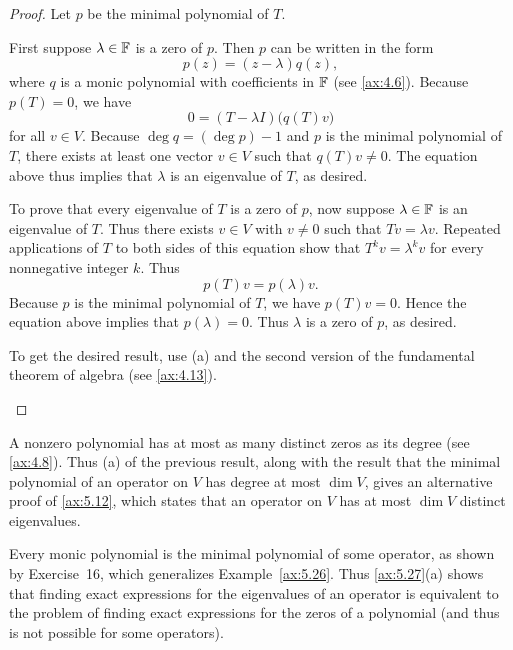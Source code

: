 \begin{proof}
Let $p$ be the minimal polynomial of $T$.
\begin{parts}
\item First suppose $\lambda\in\mathbb{F}$ is a zero of $p$. Then $p$ can be written
  in the form
  \[ p(z)=(z-\lambda)q(z), \]
  where $q$ is a monic polynomial with coefficients in $\mathbb{F}$ (see
  \ref{ax:4.6}). Because $p(T)=0$, we have
  \[ 0=(T-\lambda I)\bigl(q(T)v\bigr) \]
  for all $v\in V$. Because $\deg q=(\deg p)-1$ and $p$ is the minimal
  polynomial of $T$, there exists at least one vector $v\in V$ such that
  $q(T)v\ne0$. The equation above thus implies that $\lambda$ is an eigenvalue
  of $T$, as desired.

  To prove that every eigenvalue of $T$ is a zero of $p$, now suppose
  $\lambda\in\mathbb{F}$ is an eigenvalue of $T$. Thus there exists $v\in V$ with
  $v\ne0$ such that $Tv=\lambda v$. Repeated applications of $T$ to both sides
  of this equation show that $T^kv=\lambda^kv$ for every nonnegative integer
  $k$. Thus
  \[ p(T)v=p(\lambda)v. \]
  Because $p$ is the minimal polynomial of $T$, we have $p(T)v=0$. Hence the
  equation above implies that $p(\lambda)=0$. Thus $\lambda$ is a zero of
  $p$, as desired.
\item To get the desired result, use (a) and the second version of the
  fundamental theorem of algebra (see \ref{ax:4.13}). \qedhere
\end{parts}
\end{proof}

A nonzero polynomial has at most as many distinct zeros as its degree (see
\ref{ax:4.8}). Thus (a) of the previous result, along with the result that the
minimal polynomial of an operator on $V$ has degree at most $\dim V$, gives an
alternative proof of \ref{ax:5.12}, which states that an operator on $V$ has
at most $\dim V$ distinct eigenvalues.

Every monic polynomial is the minimal polynomial of some operator, as shown by
Exercise~16, which generalizes Example~\ref{ax:5.26}. Thus \ref{ax:5.27}(a)
shows that finding exact expressions for the eigenvalues of an operator is
equivalent to the problem of finding exact expressions for the zeros of a
polynomial (and thus is not possible for some operators).


